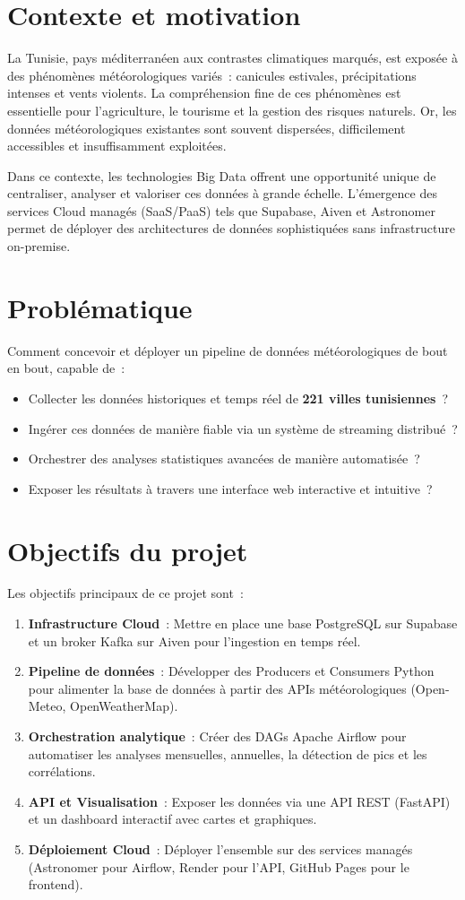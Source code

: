 \documentclass[a4paper,12pt,oneside]{report}
\begin{document}
\section{Contexte et motivation}
La Tunisie, pays méditerranéen aux contrastes climatiques marqués, est exposée à des phénomènes météorologiques variés~: canicules estivales, précipitations intenses et vents violents. La compréhension fine de ces phénomènes est essentielle pour l'agriculture, le tourisme et la gestion des risques naturels. Or, les données météorologiques existantes sont souvent dispersées, difficilement accessibles et insuffisamment exploitées.

Dans ce contexte, les technologies Big Data offrent une opportunité unique de centraliser, analyser et valoriser ces données à grande échelle. L'émergence des services Cloud managés (SaaS/PaaS) tels que Supabase, Aiven et Astronomer permet de déployer des architectures de données sophistiquées sans infrastructure on-premise.

\section{Problématique}
Comment concevoir et déployer un pipeline de données météorologiques de bout en bout, capable de~:
\begin{itemize}
  \item Collecter les données historiques et temps réel de \textbf{221 villes tunisiennes}~?
  \item Ingérer ces données de manière fiable via un système de streaming distribué~?
  \item Orchestrer des analyses statistiques avancées de manière automatisée~?
  \item Exposer les résultats à travers une interface web interactive et intuitive~?
\end{itemize}

\section{Objectifs du projet}
Les objectifs principaux de ce projet sont~:
\begin{enumerate}
  \item \textbf{Infrastructure Cloud}~: Mettre en place une base PostgreSQL sur Supabase et un broker Kafka sur Aiven pour l'ingestion en temps réel.
  \item \textbf{Pipeline de données}~: Développer des Producers et Consumers Python pour alimenter la base de données à partir des APIs météorologiques (Open-Meteo, OpenWeatherMap).
  \item \textbf{Orchestration analytique}~: Créer des DAGs Apache Airflow pour automatiser les analyses mensuelles, annuelles, la détection de pics et les corrélations.
  \item \textbf{API et Visualisation}~: Exposer les données via une API REST (FastAPI) et un dashboard interactif avec cartes et graphiques.
  \item \textbf{Déploiement Cloud}~: Déployer l'ensemble sur des services managés (Astronomer pour Airflow, Render pour l'API, GitHub Pages pour le frontend).
\end{enumerate}
\end{document}
